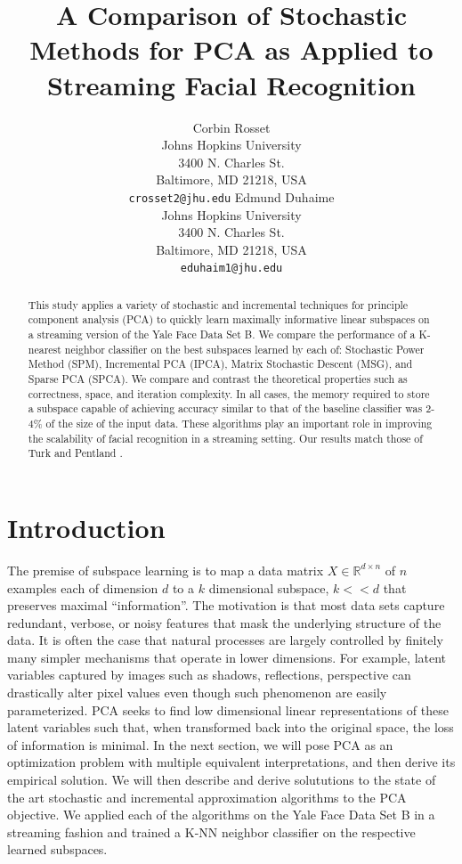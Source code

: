 \documentclass[11pt,letterpaper]{article}
\title{A Comparison of Stochastic Methods for PCA as Applied to Streaming Facial Recognition\Thanks{We would like to thank Dr. Raman Arora for his work on stochastic algorithms for manifold learning.}}
\author{Corbin Rosset\\
  Johns Hopkins University\\
  3400 N. Charles St.\\
  Baltimore, MD 21218, USA\\
  {\tt crosset2@jhu.edu}
  \And
  Edmund Duhaime \\
  Johns Hopkins University\\
  3400 N. Charles St.\\
  Baltimore, MD 21218, USA\\
  {\tt eduhaim1@jhu.edu}}
\date{}
\begin{document}
\maketitle
\begin{abstract}
  This study applies a variety of stochastic and incremental techniques for principle component analysis (PCA) to quickly learn maximally informative linear subspaces on a streaming version of the Yale Face Data Set B\cite{yale}. We compare the performance of a K-nearest neighbor classifier on the best subspaces learned by each of: Stochastic Power Method (SPM), Incremental PCA (IPCA), Matrix Stochastic Descent (MSG), and Sparse PCA (SPCA). We compare and contrast the theoretical properties such as correctness, space, and iteration complexity. In all cases, the memory required to store a subspace capable of achieving accuracy similar to that of the baseline classifier was  2-4$\%$ of the size of the input data. These algorithms play an important role in improving the scalability of facial recognition in a streaming setting. Our results match those of Turk and Pentland \cite{turk}. 
\end{abstract}

\section{Introduction}

The premise of subspace learning is to map a data matrix $X \in \mathbb{R}^{d \times n}$ of $n$ examples each of dimension $d$ to a $k$ dimensional subspace, $k << d$ that preserves maximal ``information''. The motivation is that most data sets capture redundant, verbose, or noisy features that mask the underlying structure of the data.  It is often the case that natural processes are largely controlled by finitely many simpler mechanisms that operate in lower dimensions. For example, latent variables captured by images such as shadows, reflections, perspective can drastically alter pixel values even though such phenomenon are easily parameterized. PCA seeks to find low dimensional linear representations of these latent variables such that, when transformed back into the original space, the loss of information is minimal. In the next section, we will pose PCA as an optimization problem with multiple equivalent interpretations, and then derive its empirical solution. We will then describe and derive solututions to the state of the art stochastic and incremental approximation algorithms to the PCA objective. We applied each of the algorithms on the Yale Face Data Set B in a streaming fashion and trained a K-NN neighbor classifier on the respective learned subspaces. 
\end{document}
